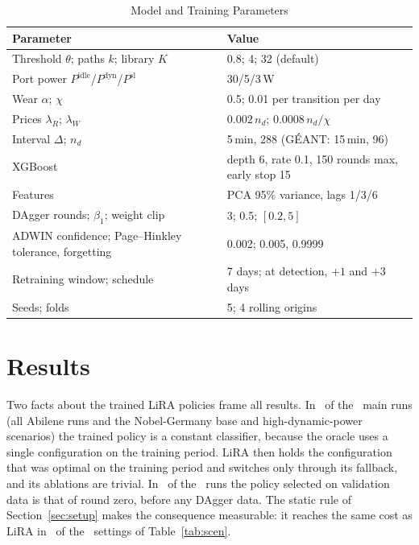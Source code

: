 \documentclass[preprint,12pt]{elsarticle}
\begin{document}
\begin{table}[t]
\centering
\caption{Model and Training Parameters}
\label{tab:params}
\footnotesize
\setlength{\tabcolsep}{3pt}
\begin{tabular}{@{}p{3.9cm}p{4.6cm}@{}}
\toprule
Parameter & Value \\
\midrule
Threshold $\theta$; paths $k$; library $K$ & 0.8; 4; 32 (default) \\
Port power $P^{\mathrm{idle}}$/$P^{\mathrm{dyn}}$/$P^{\mathrm{sl}}$ & 30/5/3\,W \\
Wear $\alpha$; $\chi$ & 0.5; 0.01 per transition per day \\
Prices $\lambda_R$; $\lambda_W$ & $0.002\,n_d$; $0.0008\,n_d/\chi$ \\
Interval $\Delta$; $n_d$ & 5\,min, 288 (G\'{E}ANT: 15\,min, 96) \\
XGBoost & depth 6, rate 0.1, 150 rounds max, early stop 15 \\
Features & PCA 95\% variance, lags 1/3/6 \\
DAgger rounds; $\beta_1$; weight clip & 3; 0.5; $[0.2,5]$ \\
ADWIN confidence; Page--Hinkley tolerance, forgetting & 0.002; 0.005, 0.9999 \\
Retraining window; schedule & 7 days; at detection, $+1$ and $+3$ days \\
Seeds; folds & 5; 4 rolling origins \\
\bottomrule
\end{tabular}
\end{table}

\section{Results}\label{sec:results}

Two facts about the trained LiRA policies frame all results. In \liraConstRuns\ of the \liraTotalRuns\ main runs (all Abilene runs and the Nobel-Germany base and high-dynamic-power scenarios) the trained policy is a constant classifier, because the oracle uses a single configuration on the training period. LiRA then holds the configuration that was optimal on the training period and switches only through its fallback, and its ablations are trivial. In \daggerRoundZero\ of the \daggerRuns\ runs the policy selected on validation data is that of round zero, before any DAgger data. The static rule of Section~\ref{sec:setup} makes the consequence measurable: it reaches the same cost as LiRA in \staticSame\ of the \staticTotal\ settings of Table~\ref{tab:scen}.
\end{document}
